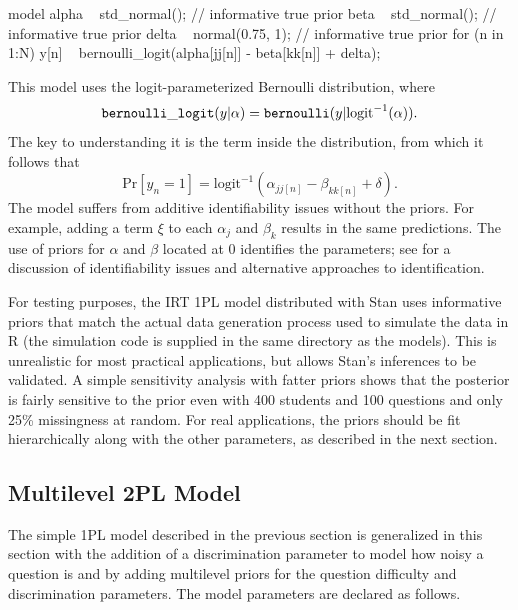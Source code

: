 \begin{stancode}
model {
  alpha ~ std_normal();         // informative true prior
  beta ~ std_normal();          // informative true prior
  delta ~ normal(0.75, 1);      // informative true prior
  for (n in 1:N)
    y[n] ~ bernoulli_logit(alpha[jj[n]] - beta[kk[n]] + delta);
}
\end{stancode}
%
This model uses the logit-parameterized Bernoulli distribution, where
\[
{\tt bernoulli\_logit}(y|\alpha) =
{\tt bernoulli}(y|\mbox{logit}^{-1}(\alpha)).
\]
%
The key to understanding it is the term inside the
 distribution, from which it follows that
\[
\mbox{Pr}[y_n = 1] = \mbox{logit}^{-1}(\alpha_{jj[n]} - \beta_{kk[n]}
+ \delta).
\]
%
The model suffers from additive identifiability issues without the
priors.  For example, adding a term $\xi$ to each $\alpha_j$ and
$\beta_k$ results in the same predictions.  The use of priors for
$\alpha$ and $\beta$ located at 0 identifies the parameters; see
\citep{GelmanHill:2007} for a discussion of identifiability issues and
alternative approaches to identification.

For testing purposes, the IRT 1PL model distributed with Stan uses
informative priors that match the actual data generation process used
to simulate the data in R (the simulation code is supplied in the same
directory as the models).  This is unrealistic for most practical
applications, but allows Stan's inferences to be validated.  A simple
sensitivity analysis with fatter priors shows that the posterior is
fairly sensitive to the prior even with 400 students and 100 questions
and only 25\% missingness at random.  For real applications, the
priors should be fit hierarchically along with the other parameters,
as described in the next section.


\subsection{Multilevel 2PL Model}

The simple 1PL model described in the previous section is generalized
in this section with the addition of a discrimination parameter to
model how noisy a question is and by adding multilevel priors for the
question difficulty and discrimination parameters.  The model
parameters are declared as follows.
%

